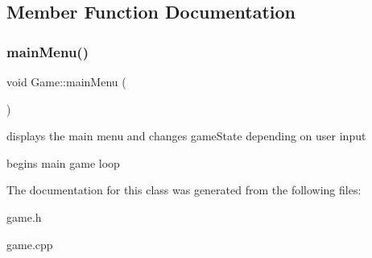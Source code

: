 \subsection{Member Function Documentation}
\mbox{\label{classGame_a5ed7fc5be77080f7f6dd5363f7f007a1}} 
\subsubsection{\texorpdfstring{mainMenu()}{mainMenu()}}
{\footnotesize\ttfamily void Game\+::main\+Menu (\begin{DoxyParamCaption}{ }\end{DoxyParamCaption})}



displays the main menu and changes game\+State depending on user input 

begins main game loop 

The documentation for this class was generated from the following files\+:\begin{DoxyCompactItemize}
\item 
game.\+h\item 
game.\+cpp\end{DoxyCompactItemize}
